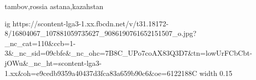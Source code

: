  
 
 
 
 

tambov,rossia
astana,kazahstan
\par
\ifcmt
  ig https://scontent-lga3-1.xx.fbcdn.net/v/t31.18172-8/16804067_107881059735627_9086190761652151507_o.jpg?_nc_cat=110&ccb=1-3&_nc_sid=09cbfe&_nc_ohc=7B8C_UPo7coAX83Q3D7&tn=lowUrFCbCbt-jOWu&_nc_ht=scontent-lga3-1.xx&oh=e9cedb9359a40437d3fca83a659b90c6&oe=6122188C
  width 0.15
\fi
